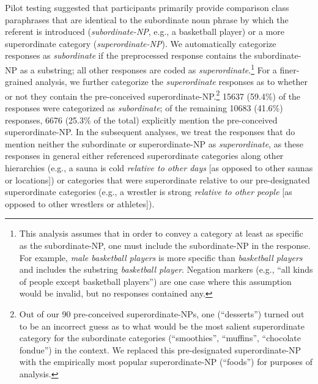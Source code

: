 \documentclass[doc, floatsintext]{apa6}
\begin{document}
Pilot testing suggested that participants primarily provide comparison class paraphrases that are identical to the subordinate noun phrase by which the referent is introduced (\emph{subordinate-NP}, e.g., a basketball player) or a more superordinate category (\emph{superordinate-NP}).
We automatically categorize responses as \emph{subordinate} if the preprocessed response contains the subordinate-NP as a substring; all other responses are coded as \emph{superordinate}.\footnote{This analysis assumes that in order to convey a category at least as specific as the subordinate-NP, one must include the subordinate-NP in the response. For example, \emph{male basketball players} is more specific than \emph{basketball players} and includes the substring \emph{basketball player}. Negation markers (e.g., ``all kinds of people except basketball players'') are one case where this assumption would be invalid, but no responses contained any.}
For a finer-grained analysis, we further categorize the \emph{superordinate} responses as to whether or not they contain the pre-conceived superordinate-NP.\footnote{Out of our 90 pre-conceived superordinate-NPs, one (``desserts'') turned out to be an incorrect guess as to what would be the most salient superordinate category for the subordinate categories (``smoothies'', ``muffins'', ``chocolate fondue'') in the context. We replaced this pre-designated superordinate-NP with the empirically most popular superordinate-NP (``foods'') for purposes of analysis.}
15637 (59.4\%) of the responses were categorized as \emph{subordinate}; of the remaining 10683 (41.6\%) responses, 6676 (25.3\% of the total) explicitly mention the pre-conceived superordinate-NP.
In the subsequent analyses, we treat the responses that do mention neither the subordinate or superordinate-NP as \emph{superordinate}, as these responses in general either referenced superordinate categories along other hierarchies (e.g., a sauna is cold \emph{relative to other days} [as opposed to other saunas or locations]) or categories that were superordinate relative to our pre-designated superordinate categories (e.g., a wrestler is strong \emph{relative to other people} [as opposed to other wrestlers or athletes]).
\end{document}
